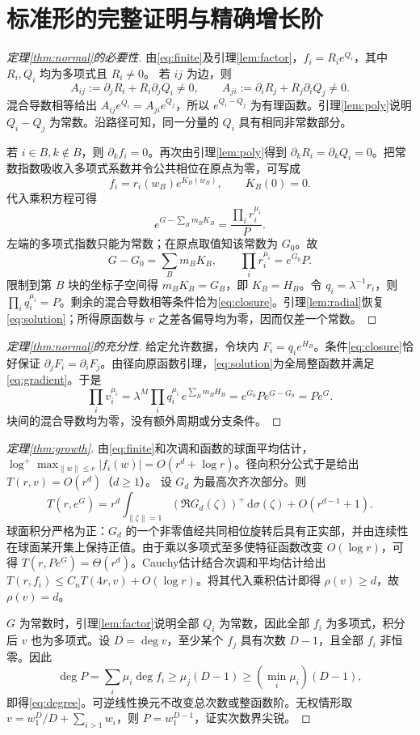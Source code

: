 \documentclass[UTF8,a4paper,zihao=-4,fontset=none]{ctexart}
\numberwithin{equation}{section}
\theoremstyle{definition}
\theoremstyle{definition}\newtheorem{definition}[theorem]{定义}
\newcommand{\dd}{\,\mathrm d}
\begin{document}
\section{标准形的完整证明与精确增长阶}
\begin{proof}[定理\ref{thm:normal}的必要性]
由\eqref{eq:finite}及引理\ref{lem:factor}，$f_i=R_i e^{Q_i}$，其中 $R_i,Q_i$ 均为多项式且 $R_i\ne0$。
若 $ij$ 为边，则
\[
 A_{ij}:=\partial_jR_i+R_i\partial_jQ_i\ne0,
 \qquad A_{ji}:=\partial_iR_j+R_j\partial_iQ_j\ne0.
\]
混合导数相等给出 $A_{ij}e^{Q_i}=A_{ji}e^{Q_j}$，所以 $e^{Q_i-Q_j}$ 为有理函数。引理\ref{lem:poly}说明 $Q_i-Q_j$ 为常数。沿路径可知，同一分量的 $Q_i$ 具有相同非常数部分。

若 $i\in B,k\notin B$，则 $\partial_kf_i=0$。再次由引理\ref{lem:poly}得到 $\partial_kR_i=\partial_kQ_i=0$。把常数指数吸收入多项式系数并令公共相位在原点为零，可写成
\[
 f_i=r_i(w_B)e^{K_B(w_B)},\qquad K_B(0)=0.
\]
代入乘积方程可得
\[
 e^{G-\sum_Bm_BK_B}=\frac{\prod_i r_i^{\mu_i}}{P}.
\]
左端的多项式指数只能为常数；在原点取值知该常数为 $G_0$。故
\[
 G-G_0=\sum_Bm_BK_B,\qquad
 \prod_i r_i^{\mu_i}=e^{G_0}P.
\]
限制到第 $B$ 块的坐标子空间得 $m_BK_B=G_B$，即 $K_B=H_B$。令 $q_i=\lambda^{-1}r_i$，则 $\prod_iq_i^{\mu_i}=P$。剩余的混合导数相等条件恰为\eqref{eq:closure}。引理\ref{lem:radial}恢复\eqref{eq:solution}；所得原函数与 $v$ 之差各偏导均为零，因而仅差一个常数。
\end{proof}

\begin{proof}[定理\ref{thm:normal}的充分性]
给定允许数据，令块内 $F_i=q_i e^{H_B}$。条件\eqref{eq:closure}恰好保证 $\partial_jF_i=\partial_iF_j$。由径向原函数引理，\eqref{eq:solution}为全局整函数并满足\eqref{eq:gradient}。于是
\[
 \prod_i v_i^{\mu_i}
 =\lambda^M\prod_iq_i^{\mu_i}\,e^{\sum_Bm_BH_B}
 =e^{G_0}Pe^{G-G_0}=Pe^G.
\]
块间的混合导数均为零，没有额外周期或分支条件。
\end{proof}

\begin{proof}[定理\ref{thm:growth}]
由\eqref{eq:finite}和次调和函数的球面平均估计，$\log^+\max_{\|w\|\le r}|f_i(w)|=O(r^d+\log r)$。径向积分公式于是给出 $T(r,v)=O(r^d)$（$d\ge1$）。
设 $G_d$ 为最高次齐次部分。则
\[
 T(r,e^G)=r^d\int_{\|\zeta\|=1}(\Re G_d(\zeta))^+\dd\sigma(\zeta)
 +O(r^{d-1}+1).
\]
球面积分严格为正：$G_d$ 的一个非零值经共同相位旋转后具有正实部，并由连续性在球面某开集上保持正值。由于乘以多项式至多使特征函数改变 $O(\log r)$，可得 $T(r,Pe^G)=\Theta(r^d)$。Cauchy估计结合次调和平均估计给出 $T(r,f_i)\le C_nT(4r,v)+O(\log r)$。将其代入乘积估计即得 $\rho(v)\ge d$，故 $\rho(v)=d$。

$G$ 为常数时，引理\ref{lem:factor}说明全部 $Q_i$ 为常数，因此全部 $f_i$ 为多项式，积分后 $v$ 也为多项式。设 $D=\deg v$，至少某个 $f_j$ 具有次数 $D-1$，且全部 $f_i$ 非恒零。因此
\[
 \deg P=\sum_i\mu_i\deg f_i
 \ge\mu_j(D-1)\ge(\min_i\mu_i)(D-1),
\]
即得\eqref{eq:degree}。可逆线性换元不改变总次数或整函数阶。无权情形取 $v=w_1^D/D+\sum_{i>1}w_i$，则 $P=w_1^{D-1}$，证实次数界尖锐。
\end{proof}
\end{document}
